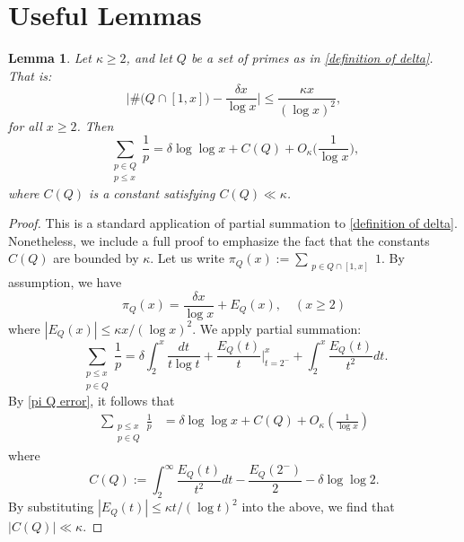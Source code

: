 \documentclass{amsart}
\newtheorem{lemma}[theorem]{Lemma}
\theoremstyle{definition}
\numberwithin{equation}{section}
\newcommand{\density}{\delta}
\begin{document}
	\section{Useful Lemmas}
	\begin{lemma}\label{defining Q} Let $\kappa \ge 2$, and let $Q$ be a set of primes as in \eqref{definition of delta}. That is: 
		$$\Big|\#\big(Q\cap[1,x]\big) - \frac{ \delta x}{\log x}\Big|\le \frac{\kappa x}{(\log x)^2},$$ for all $x\ge2$. Then
		\begin{equation}
			\sum_{\substack{p \in Q\\ p \leq x}} \frac{1}{p} = \density \log \log x + C(Q) +O_\kappa\bigg(\frac{1}{\log x}\bigg),
		\end{equation}
		where $C(Q)$ is a constant satisfying $C(Q) \ll \kappa$.
	\end{lemma}
	\begin{proof}
		This is a standard application of partial summation to \eqref{definition of delta}. Nonetheless, we include a full proof to emphasize the fact that the constants $C(Q)$ are bounded by $\kappa$. Let us write $\pi_Q(x) := \sum_{\substack{p \in  Q \cap[1,x]}} 1$. By assumption, we have
		\begin{equation}\label{pi Q error}
			\pi_Q(x) = \frac{\density x}{\log x} + E_Q(x), \quad (x \geq 2)
		\end{equation}
		where $|E_Q(x)| \leq \kappa x/(\log x)^2$. We apply partial summation:
		$$\sum_{\substack{p \leq x \\ p \in Q}} \frac{1}{p} = \delta \int_2^x \frac{dt}{t \log t}+ \frac{E_Q(t)}{t}\Big|_{t=2^-}^x + \int_2^x \frac{E_Q(t)}{t^2} dt.$$
		By \eqref{pi Q error}, it follows that
		\begin{align*}
			\sum_{\substack{p \leq x \\ p \in Q}} \frac{1}{p} &=  \density \log \log x+C(Q) + O_\kappa\left(\frac{1}{\log x}\right)
		\end{align*}
		where $$C(Q) :=\int_2^\infty \frac{E_Q(t)}{t^2}dt -\frac{E_Q(2^-)}{2}-\density \log \log 2 .$$
		By substituting $|E_Q(t)| \leq \kappa t/(\log t)^2$ into the above, we find that ${|C(Q)| \ll \kappa}$.\end{proof}
	
\end{document}
